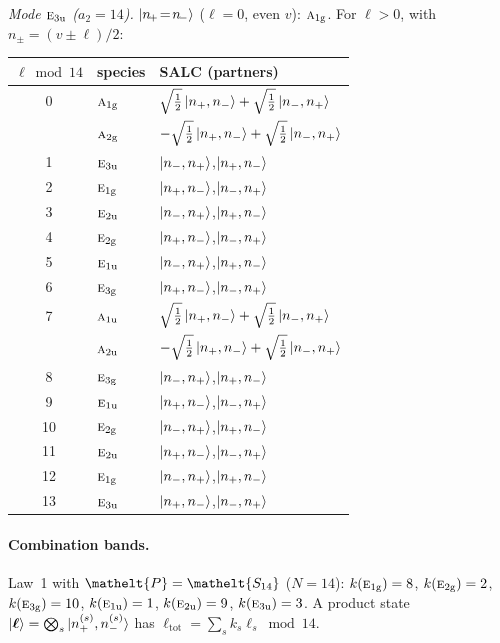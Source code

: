 \documentclass[11pt]{article}
\newcommand{\eltfont}[1]{{\let\sigma\eltsigma\mathelt{#1}}}
\newcommand{\irr}[1]{\text{\normalfont\scshape #1}}
\newcommand{\elt}[1]{\eltfont{#1}}
\newcommand{\ptag}[1]{\mathrm{#1}}
\newcommand{\pel}{\elt{P}}             %
\begin{document}
\emph{Mode $\irr{e}_{3\ptag{u}}$ ($a_2=14$).} $\ket{n_{\!+}\!=\!n_{\!-}}$ ($\ell=0$, even $v$): $\irr{a}_{1\ptag{g}}$. For $\ell>0$, with $n_\pm=(v\pm\ell)/2$:
\begin{longtable}{c l l}\hline $\ell\bmod 14$ & species & SALC (partners)\\ \hline\endhead
0 & $\irr{a}_{1\ptag{g}}$ & $\sqrt{\tfrac{1}{2}}\ket{n_+,n_-}+\sqrt{\tfrac{1}{2}}\ket{n_-,n_+}$\\
 & $\irr{a}_{2\ptag{g}}$ & $-\sqrt{\tfrac{1}{2}}\ket{n_+,n_-}+\sqrt{\tfrac{1}{2}}\ket{n_-,n_+}$\\
1 & $\irr{e}_{3\ptag{u}}$ & $\ket{n_-,n_+}$,\quad $\ket{n_+,n_-}$\\
2 & $\irr{e}_{1\ptag{g}}$ & $\ket{n_+,n_-}$,\quad $\ket{n_-,n_+}$\\
3 & $\irr{e}_{2\ptag{u}}$ & $\ket{n_-,n_+}$,\quad $\ket{n_+,n_-}$\\
4 & $\irr{e}_{2\ptag{g}}$ & $\ket{n_+,n_-}$,\quad $\ket{n_-,n_+}$\\
5 & $\irr{e}_{1\ptag{u}}$ & $\ket{n_-,n_+}$,\quad $\ket{n_+,n_-}$\\
6 & $\irr{e}_{3\ptag{g}}$ & $\ket{n_+,n_-}$,\quad $\ket{n_-,n_+}$\\
7 & $\irr{a}_{1\ptag{u}}$ & $\sqrt{\tfrac{1}{2}}\ket{n_+,n_-}+\sqrt{\tfrac{1}{2}}\ket{n_-,n_+}$\\
 & $\irr{a}_{2\ptag{u}}$ & $-\sqrt{\tfrac{1}{2}}\ket{n_+,n_-}+\sqrt{\tfrac{1}{2}}\ket{n_-,n_+}$\\
8 & $\irr{e}_{3\ptag{g}}$ & $\ket{n_-,n_+}$,\quad $\ket{n_+,n_-}$\\
9 & $\irr{e}_{1\ptag{u}}$ & $\ket{n_+,n_-}$,\quad $\ket{n_-,n_+}$\\
10 & $\irr{e}_{2\ptag{g}}$ & $\ket{n_-,n_+}$,\quad $\ket{n_+,n_-}$\\
11 & $\irr{e}_{2\ptag{u}}$ & $\ket{n_+,n_-}$,\quad $\ket{n_-,n_+}$\\
12 & $\irr{e}_{1\ptag{g}}$ & $\ket{n_-,n_+}$,\quad $\ket{n_+,n_-}$\\
13 & $\irr{e}_{3\ptag{u}}$ & $\ket{n_+,n_-}$,\quad $\ket{n_-,n_+}$\\
\hline\end{longtable}

\paragraph{Combination bands.}

Law~1 with $\pel=\elt{S_{14}}$ ($N=14$): $k(\irr{e}_{1\ptag{g}})=8$, $k(\irr{e}_{2\ptag{g}})=2$, $k(\irr{e}_{3\ptag{g}})=10$, $k(\irr{e}_{1\ptag{u}})=1$, $k(\irr{e}_{2\ptag{u}})=9$, $k(\irr{e}_{3\ptag{u}})=3$. A product state $\ket{\boldsymbol\ell}=\bigotimes_s\ket{n_+^{(s)},n_-^{(s)}}$ has $\ell_{\mathrm{tot}}=\sum_sk_s\ell_s\bmod 14$.
\end{document}
